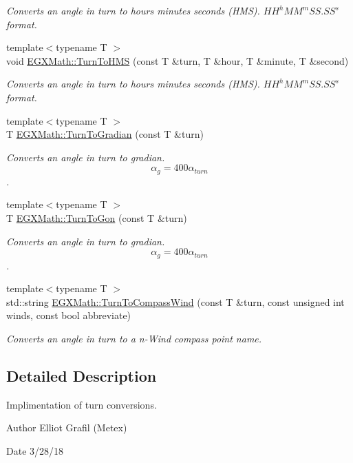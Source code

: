 \begin{DoxyCompactItemize}
\begin{DoxyCompactList}\small\item\em Converts an angle in turn to hours minutes seconds (H\+MS). ${HH}^h{MM}^m{SS.SS}^s$ format. \end{DoxyCompactList}\item 
{\footnotesize template$<$typename T $>$ }\\void \mbox{\hyperlink{group___e_g_x_math-_conversions-_angle_conversions-_turn_ga74efaece2f95aa6671f18382e5f3925f}{E\+G\+X\+Math\+::\+Turn\+To\+H\+MS}} (const T \&turn, T \&hour, T \&minute, T \&second)
\begin{DoxyCompactList}\small\item\em Converts an angle in turn to hours minutes seconds (H\+MS). ${HH}^h{MM}^m{SS.SS}^s$ format. \end{DoxyCompactList}\item 
{\footnotesize template$<$typename T $>$ }\\T \mbox{\hyperlink{group___e_g_x_math-_conversions-_angle_conversions-_turn_gad6aa9bdde2cde17cec136b24ee017bba}{E\+G\+X\+Math\+::\+Turn\+To\+Gradian}} (const T \&turn)
\begin{DoxyCompactList}\small\item\em Converts an angle in turn to gradian. \[\alpha_{g}=400\alpha_{turn}\]. \end{DoxyCompactList}\item 
{\footnotesize template$<$typename T $>$ }\\T \mbox{\hyperlink{group___e_g_x_math-_conversions-_angle_conversions-_turn_gad81dd0bb1660ef24e28fa15b2403dec7}{E\+G\+X\+Math\+::\+Turn\+To\+Gon}} (const T \&turn)
\begin{DoxyCompactList}\small\item\em Converts an angle in turn to gradian. \[\alpha_{g}=400\alpha_{turn}\]. \end{DoxyCompactList}\item 
{\footnotesize template$<$typename T $>$ }\\std\+::string \mbox{\hyperlink{group___e_g_x_math-_conversions-_angle_conversions-_turn_gaea42f973566f770cc3552831717f525e}{E\+G\+X\+Math\+::\+Turn\+To\+Compass\+Wind}} (const T \&turn, const unsigned int winds, const bool abbreviate)
\begin{DoxyCompactList}\small\item\em Converts an angle in turn to a n-\/\+Wind compass point name. \end{DoxyCompactList}\end{DoxyCompactItemize}


\subsection{Detailed Description}
Implimentation of turn conversions. 

\begin{DoxyAuthor}{Author}
Elliot Grafil (Metex) 
\end{DoxyAuthor}
\begin{DoxyDate}{Date}
3/28/18 
\end{DoxyDate}
